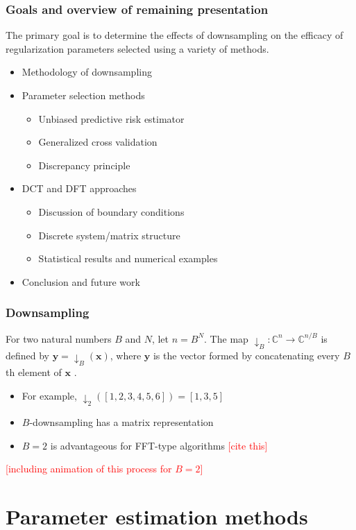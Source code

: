 \documentclass[t]{beamer}
\newcommand{\ToDo}[1]{\textcolor{red}{[#1]}}
\begin{document}
\begin{frame}
\frametitle{Goals and overview of remaining presentation}
\begin{block}{}
The primary goal is to determine the effects of downsampling on the efficacy of regularization parameters selected using a variety of methods.
\end{block}
\begin{itemize}
\item Methodology of downsampling
\item Parameter selection methods
\begin{itemize}
\item Unbiased predictive risk estimator
\item Generalized cross validation
\item Discrepancy principle
\end{itemize}
\item DCT and DFT approaches
\begin{itemize}
\item Discussion of boundary conditions
\item Discrete system/matrix structure
\item Statistical results and numerical examples
\end{itemize}
\item Conclusion and future work
\end{itemize}
\end{frame}

\begin{frame}
\frametitle{Downsampling}
For two natural numbers $B$ and $N$, let $n = B^N$. The map $\downarrow_B:\mathbb{C}^n \rightarrow \mathbb{C}^{n/B}$ is defined by $\mathbf{y} = \downarrow_B(\mathbf{x})$, where $\mathbf{y}$ is the vector formed by concatenating every $B$th element of $\mathbf{x}$ \cite{AudioDFT}.
\begin{itemize}
\item For example, $\downarrow_2([1,2,3,4,5,6]) = [1,3,5]$
\item $B$-downsampling has a matrix representation
\item $B = 2$ is advantageous for FFT-type algorithms \ToDo{cite this}
\end{itemize}
\ToDo{including animation of this process for $B = 2$}
\end{frame}

\section{Parameter estimation methods}
\end{document}
